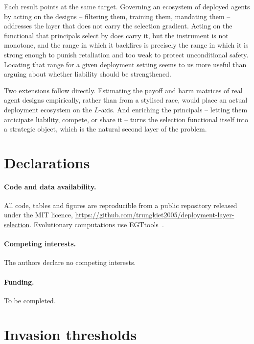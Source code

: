 \documentclass[11pt,a4paper]{article}
\theoremstyle{definition}
\begin{document}
Each result points at the same target. Governing an ecosystem of deployed
agents by acting on the designs -- filtering them, training them, mandating
them -- addresses the layer that does not carry the selection gradient.
Acting on the functional that principals select by does carry it, but the
instrument is not monotone, and the range in which it backfires is precisely
the range in which it is strong enough to punish retaliation and too weak to
protect unconditional safety. Locating that range for a given deployment
setting seems to us more useful than arguing about whether liability should be
strengthened.

Two extensions follow directly. Estimating the payoff and harm matrices of
real agent designs empirically, rather than from a stylised race, would place
an actual deployment ecosystem on the $L$-axis. And enriching the principals
-- letting them anticipate liability, compete, or share it -- turns the
selection functional itself into a strategic object, which is the natural
second layer of the problem.

\section*{Declarations}

\paragraph{Code and data availability.}
All code, tables and figures are reproducible from a public repository
released under the MIT licence,
\sloppy\url{https://github.com/trungkiet2005/deployment-layer-selection}.
Evolutionary computations use EGTtools~\citep{domingos2023egttools}.

\paragraph{Competing interests.} The authors declare no competing interests.

\paragraph{Funding.} To be completed.

\appendix

\section{Invasion thresholds}\label{app:tables}
\end{document}
